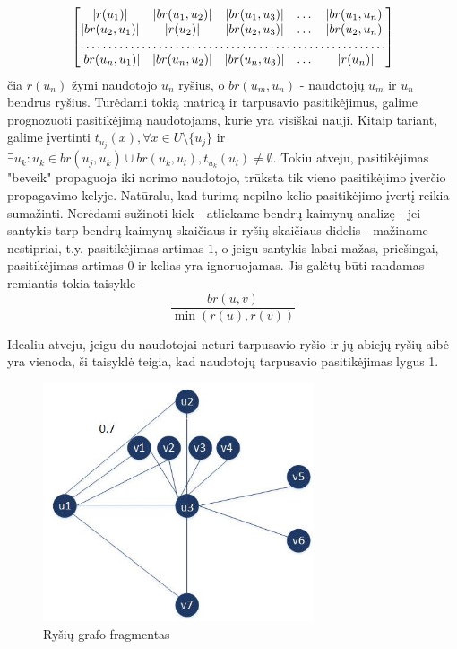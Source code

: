 \documentclass{VUMIFInfMagistrinis}
\begin{document}
\[
\begin{bmatrix}
|r(u_1)|       & |br(u_1,u_2)| & |br(u_1,u_3)| & \dots & |br(u_1, u_n)| \\
|br(u_2,u_1)|      & |r(u_2)| & |br(u_2,u_3)| & \dots & |br(u_2,u_n)| \\
\hdotsfor{5} \\
|br(u_n,u_1)|       & |br(u_n,u_2)| & |br(u_n,u_3)| & \dots & |r(u_n)|
\end{bmatrix}
\]
čia $r(u_n)$ žymi naudotojo $u_n$ ryšius, o  $br(u_m, u_n)$ - naudotojų $u_m$ ir $u_n$ bendrus ryšius. Turėdami tokią matricą ir tarpusavio pasitikėjimus, galime prognozuoti pasitikėjimą naudotojams, kurie yra visiškai nauji. Kitaip tariant, galime įvertinti $t_{u_j}(x), \forall x \in U\setminus \{u_j\}$ ir $\exists u_k : u_k \in br(u_j,u_k) \cup br(u_k,u_l), t_{u_k}(u_l) \neq \emptyset$. Tokiu atveju, pasitikėjimas "beveik" propaguoja iki norimo naudotojo, trūksta tik vieno pasitikėjimo įverčio propagavimo kelyje. Natūralu, kad turimą nepilno kelio pasitikėjimo įvertį reikia sumažinti. Norėdami sužinoti kiek - atliekame bendrų kaimynų analizę - jei santykis tarp bendrų kaimynų skaičiaus ir ryšių skaičiaus didelis - mažiname nestipriai, t.y. pasitikėjimas artimas $1$, o jeigu santykis labai mažas, priešingai, pasitikėjimas artimas $0$ ir kelias yra ignoruojamas. Jis galėtų būti randamas remiantis tokia taisykle - 
\begin{equation}\label{rule:sim}
\frac{br(u,v)}{\min(r(u), r(v))}
\end{equation}

Idealiu atveju, jeigu du naudotojai neturi tarpusavio ryšio ir jų abiejų ryšių aibė yra vienoda, ši taisyklė teigia, kad naudotojų tarpusavio pasitikėjimas lygus 1.
\begin{figure}[ht!]
	\centering
	\includegraphics[width=80mm]{common_neighbors.jpg}
	\caption{Ryšių grafo fragmentas} \label{common_neighbors}
\end{figure}
\end{document}
